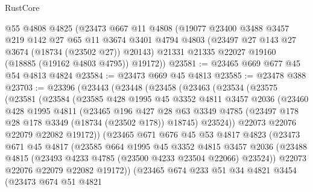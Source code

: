 \begin{lexlean}{RustCore}
\begin{coremodule}
    @55
    @4808
    @4825
    (@23473
      @667
      @11
      @4808
      (@19077
        @23400
        @3488
        @3457
        @219
        @142
        @27
        @65
        @11
        @3674
        @3401
        @4794
        @4803
        (@23497 @27 @143 @27 @3674 (@18734 (@23502 @27)) @20143)
        @21331
        @21335
        @22027
        @19160
        (@18885 (@19162 @4803 @4795))
        @19172))
@23581 := @23465 @669 @677 @45 @54 @4813 @4824
@23584 := @23473 @669 @45 @4813
@23585 := @23478 @388
@23703 := @23396
    (@23443
      (@23448
        (@23458
          (@23463
            (@23534
              (@23575
                (@23581
                  (@23584
                    (@23585
                      @428
                      @1995
                      @45
                      @3352
                      @4811
                      @3457
                      @2036
                      (@23460
                        @428
                        @1995
                        @4811
                        (@23465
                          @196
                          @427
                          @28
                          @63
                          @3349
                          @4785
                          (@23497 @178 @28 @178 @3349 (@18734 (@23502 @178)) @18745)
                          @23524))
                      @22073
                      @22076
                      @22079
                      @22082
                      @19172))
                  (@23465
                    @671
                    @676
                    @45
                    @53
                    @4817
                    @4823
                    (@23473
                      @671
                      @45
                      @4817
                      (@23585
                        @664
                        @1995
                        @45
                        @3352
                        @4815
                        @3457
                        @2036
                        (@23488 @4815 (@23493 @4233 @4785 (@23500 @4233 @23504 @22066) @23524))
                        @22073
                        @22076
                        @22079
                        @22082
                        @19172))
                    (@23465
                      @674
                      @233
                      @51
                      @34
                      @4821
                      @3454
                      (@23473
                        @674
                        @51
                        @4821

\end{coremodule}
\end{lexlean}
